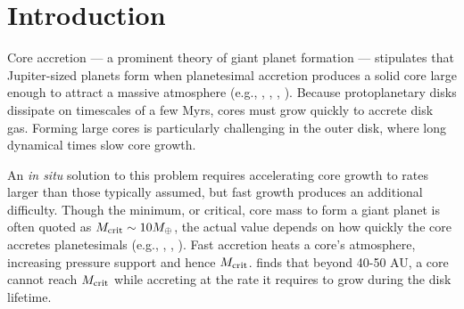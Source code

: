 \documentclass[apj]{emulateapj}
\begin{document}
\begin{abstract}
\end{abstract}

\section{Introduction}
\label{intro}

Core accretion --- a prominent theory of giant planet formation --- stipulates that Jupiter-sized planets form when planetesimal accretion produces a solid core large enough to attract a massive atmosphere   (e.g., \citealt{mizuno78}, \citealt{stevenson82}, \citealt{boden86}, \citealt{dangelo11}). Because protoplanetary disks dissipate on timescales of a few Myrs, cores must grow quickly to accrete disk gas. Forming large cores is particularly challenging in the outer disk, where long dynamical times slow core growth. %

An \textit{in situ} solution to this problem requires accelerating core growth to rates larger than those typically assumed, but fast growth produces an additional difficulty.  Though the minimum, or critical, core mass to form a giant planet is often quoted as $M_{\rm crit}\sim 10M_{\oplus}$, the actual value depends on how quickly the core accretes planetesimals  (e.g.,  \citealt{pollack96}, \citealt{ikoma00}, \citealt{rafikov06}).  Fast accretion heats a core's atmosphere, increasing pressure support and hence $M_{\rm crit}$.  \citet{rafikov11} finds that beyond 40-50 AU, a core cannot  reach $M_{\rm crit}$ while accreting at the rate it requires to grow during the disk lifetime.
\end{document}
